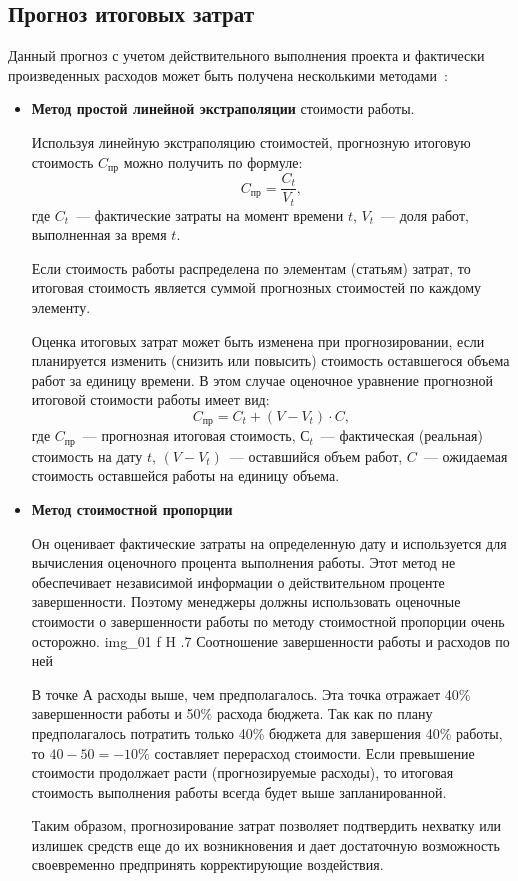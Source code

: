 \subsection{Прогноз итоговых затрат}
Данный прогноз с учетом действительного выполнения проекта и фактически произведенных расходов может быть получена несколькими методами~\cite{project3}:
\begin{itemize}
	\item \textbf{Метод простой линейной экстраполяции} стоимости работы.
	
	Используя линейную экстраполяцию стоимостей, прогнозную итоговую стоимость $C_{пр}$ можно получить по формуле:
	\begin{equation} 
		C_{\text{пр}} = \frac{C_t}{V_t}, 
	\end{equation}
	где $C_{t}$~--- фактические затраты на момент времени $t$, $V_{t}$~--- доля работ, выполненная за время $t$.
	
	Если стоимость работы распределена по элементам (статьям) затрат, то итоговая стоимость является суммой прогнозных стоимостей по каждому элементу.
	
	Оценка итоговых затрат может быть изменена при прогнозировании, если планируется изменить (снизить или повысить) стоимость оставшегося объема работ за единицу времени. 
	В этом случае оценочное уравнение прогнозной итоговой стоимости работы имеет вид:
	\begin{equation}
		C_{\text{пр}} = C_{t} + (V - V_{t}) \cdot C,
	\end{equation}
	где $C_{\text{пр}}$~--- прогнозная итоговая стоимость, $С_{t}$~--- фактическая (реальная) стоимость на дату $t$, $(V - V_{t})$~--- оставшийся объем работ, $C$~--- ожидаемая стоимость оставшейся работы на единицу объема.
	
	\item \textbf{Метод стоимостной пропорции}
	
	Он оценивает фактические затраты на определенную дату и используется для вычисления оценочного процента выполнения работы. 
	Этот метод не обеспечивает независимой информации о действительном проценте завершенности. 
	Поэтому менеджеры должны использовать оценочные стоимости о завершенности работы по методу стоимостной пропорции очень осторожно.
	{img_01}
	{f}
	{H}
	{.7\textwidth}
	{Соотношение завершенности работы и расходов по ней}
	
	В точке А расходы выше, чем предполагалось. 
	Эта точка отражает 40\% завершенности работы и 50\% расхода бюджета. 
	Так как по плану предполагалось потратить только 40\% бюджета для завершения 40\% работы, то $40-50 =-10\%$ составляет перерасход стоимости. 
	Если превышение стоимости продолжает расти (прогнозируемые расходы), то итоговая стоимость выполнения работы всегда будет выше запланированной.
	
	Таким образом, прогнозирование затрат позволяет подтвердить нехватку или излишек средств еще до их возникновения и дает достаточную возможность своевременно предпринять корректирующие воздействия.
\end{itemize}

